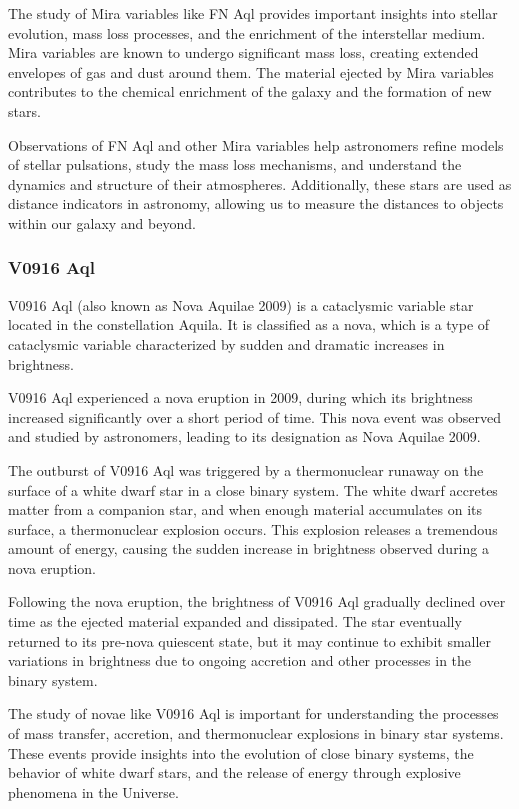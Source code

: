 The study of Mira variables like FN Aql provides important insights into stellar evolution, mass loss processes, and the enrichment of the interstellar medium. Mira variables are known to undergo significant mass loss, creating extended envelopes of gas and dust around them. The material ejected by Mira variables contributes to the chemical enrichment of the galaxy and the formation of new stars.

Observations of FN Aql and other Mira variables help astronomers refine models of stellar pulsations, study the mass loss mechanisms, and understand the dynamics and structure of their atmospheres. Additionally, these stars are used as distance indicators in astronomy, allowing us to measure the distances to objects within our galaxy and beyond.

\subsubsection*{ V0916 Aql }

V0916 Aql (also known as Nova Aquilae 2009) is a cataclysmic variable star located in the constellation Aquila. It is classified as a nova, which is a type of cataclysmic variable characterized by sudden and dramatic increases in brightness.

V0916 Aql experienced a nova eruption in 2009, during which its brightness increased significantly over a short period of time. This nova event was observed and studied by astronomers, leading to its designation as Nova Aquilae 2009.

The outburst of V0916 Aql was triggered by a thermonuclear runaway on the surface of a white dwarf star in a close binary system. The white dwarf accretes matter from a companion star, and when enough material accumulates on its surface, a thermonuclear explosion occurs. This explosion releases a tremendous amount of energy, causing the sudden increase in brightness observed during a nova eruption.

Following the nova eruption, the brightness of V0916 Aql gradually declined over time as the ejected material expanded and dissipated. The star eventually returned to its pre-nova quiescent state, but it may continue to exhibit smaller variations in brightness due to ongoing accretion and other processes in the binary system.

The study of novae like V0916 Aql is important for understanding the processes of mass transfer, accretion, and thermonuclear explosions in binary star systems. These events provide insights into the evolution of close binary systems, the behavior of white dwarf stars, and the release of energy through explosive phenomena in the Universe.

